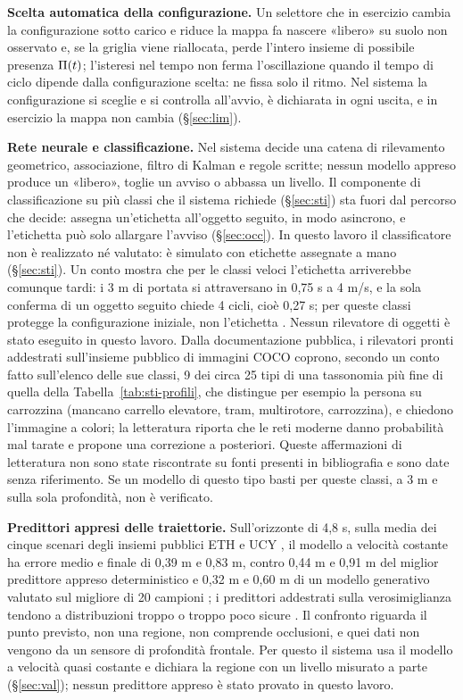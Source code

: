 \textbf{Scelta automatica della configurazione.} Un selettore che in esercizio cambia la configurazione sotto carico e riduce la mappa fa nascere «libero» su suolo non osservato e, se la griglia viene riallocata, perde l'intero insieme di possibile presenza $\Pi(t)$; l'isteresi nel tempo non ferma l'oscillazione quando il tempo di ciclo dipende dalla configurazione scelta: ne fissa solo il ritmo. Nel sistema la configurazione si sceglie e si controlla all'avvio, è dichiarata in ogni uscita, e in esercizio la mappa non cambia (\S\ref{sec:lim}). 

\textbf{Rete neurale e classificazione.} Nel sistema decide una catena di rilevamento geometrico, associazione, filtro di Kalman e regole scritte; nessun modello appreso produce un «libero», toglie un avviso o abbassa un livello. Il componente di classificazione su più classi che il sistema richiede (\S\ref{sec:sti}) sta fuori dal percorso che decide: assegna un'etichetta all'oggetto seguito, in modo asincrono, e l'etichetta può solo allargare l'avviso (\S\ref{sec:occ}). In questo lavoro il classificatore non è realizzato né valutato: è simulato con etichette assegnate a mano (\S\ref{sec:sti}). Un conto mostra che per le classi veloci l'etichetta arriverebbe comunque tardi: i 3 m di portata si attraversano in 0,75 s a 4 m/s, e la sola conferma di un oggetto seguito chiede 4 cicli, cioè 0,27 s; per queste classi protegge la configurazione iniziale, non l'etichetta . Nessun rilevatore di oggetti è stato eseguito in questo lavoro. Dalla documentazione pubblica, i rilevatori pronti addestrati sull'insieme pubblico di immagini COCO coprono, secondo un conto fatto sull'elenco delle sue classi, 9 dei circa 25 tipi di una tassonomia più fine di quella della Tabella~\ref{tab:sti-profili}, che distingue per esempio la persona su carrozzina (mancano carrello elevatore, tram, multirotore, carrozzina), e chiedono l'immagine a colori; la letteratura riporta che le reti moderne danno probabilità mal tarate e propone una correzione a posteriori. Queste affermazioni di letteratura non sono state riscontrate su fonti presenti in bibliografia e sono date senza riferimento. Se un modello di questo tipo basti per queste classi, a 3 m e sulla sola profondità, non è verificato. 

\textbf{Predittori appresi delle traiettorie.} Sull'orizzonte di 4,8 s, sulla media dei cinque scenari degli insiemi pubblici ETH e UCY \cite{pellegrini2009,lerner2007}, il modello a velocità costante ha errore medio e finale di 0,39 m e 0,83 m, contro 0,44 m e 0,91 m del miglior predittore appreso deterministico e 0,32 m e 0,60 m di un modello generativo valutato sul migliore di 20 campioni \cite{scholler2020}; i predittori addestrati sulla verosimiglianza tendono a distribuzioni troppo o troppo poco sicure \cite{cheraghipouria2026}. Il confronto riguarda il punto previsto, non una regione, non comprende occlusioni, e quei dati non vengono da un sensore di profondità frontale. Per questo il sistema usa il modello a velocità quasi costante e dichiara la regione con un livello misurato a parte (\S\ref{sec:val}); nessun predittore appreso è stato provato in questo lavoro.

